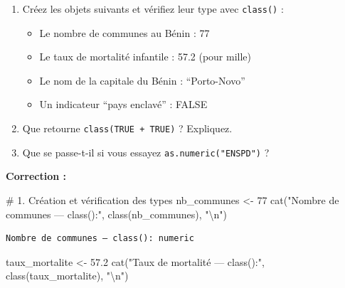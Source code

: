 \documentclass[
  french,
  11pt,
  a4paper,
]{article}
\newenvironment{Shaded}{}{}
\newcommand{\CommentTok}[1]{\textcolor[rgb]{0.42,0.45,0.49}{#1}}
\newcommand{\DecValTok}[1]{\textcolor[rgb]{0.00,0.36,0.77}{#1}}
\newcommand{\FloatTok}[1]{\textcolor[rgb]{0.00,0.36,0.77}{#1}}
\newcommand{\FunctionTok}[1]{\textcolor[rgb]{0.44,0.26,0.76}{#1}}
\newcommand{\NormalTok}[1]{\textcolor[rgb]{0.14,0.16,0.18}{#1}}
\newcommand{\OtherTok}[1]{\textcolor[rgb]{0.44,0.26,0.76}{#1}}
\newcommand{\SpecialCharTok}[1]{\textcolor[rgb]{0.00,0.36,0.77}{#1}}
\newcommand{\StringTok}[1]{\textcolor[rgb]{0.01,0.18,0.38}{#1}}
\providecommand{\tightlist}{%
  \setlength{\itemsep}{0pt}\setlength{\parskip}{0pt}}
\begin{document}
\begin{tcolorbox}[enhanced jigsaw, arc=.35mm, bottomrule=.15mm, bottomtitle=1mm, breakable, colback=white, colbacktitle=quarto-callout-caution-color!10!white, colframe=quarto-callout-caution-color-frame, coltitle=black, left=2mm, leftrule=.75mm, opacityback=0, opacitybacktitle=0.6, rightrule=.15mm, title=\textcolor{quarto-callout-caution-color}{\faFire}\hspace{0.5em}{Exercice 3 --- Types de données}, titlerule=0mm, toprule=.15mm, toptitle=1mm]

\begin{enumerate}
\def\labelenumi{\arabic{enumi}.}
\item
  Créez les objets suivants et vérifiez leur type avec \texttt{class()}
  :

  \begin{itemize}
  \tightlist
  \item
    Le nombre de communes au Bénin : 77
  \item
    Le taux de mortalité infantile : 57.2 (pour mille)
  \item
    Le nom de la capitale du Bénin : ``Porto-Novo''
  \item
    Un indicateur ``pays enclavé'' : FALSE
  \end{itemize}
\item
  Que retourne \texttt{class(TRUE\ +\ TRUE)} ? Expliquez.
\item
  Que se passe-t-il si vous essayez \texttt{as.numeric("ENSPD")} ?
\end{enumerate}

\end{tcolorbox}

\textbf{Correction :}

\begin{Shaded}
\begin{Highlighting}[]
\CommentTok{\# 1. Création et vérification des types}
\NormalTok{nb\_communes }\OtherTok{\textless{}{-}} \DecValTok{77}
\FunctionTok{cat}\NormalTok{(}\StringTok{"Nombre de communes — class():"}\NormalTok{, }\FunctionTok{class}\NormalTok{(nb\_communes), }\StringTok{"}\SpecialCharTok{\textbackslash{}n}\StringTok{"}\NormalTok{)}
\end{Highlighting}
\end{Shaded}

\begin{verbatim}
Nombre de communes — class(): numeric 
\end{verbatim}

\begin{Shaded}
\begin{Highlighting}[]
\NormalTok{taux\_mortalite }\OtherTok{\textless{}{-}} \FloatTok{57.2}
\FunctionTok{cat}\NormalTok{(}\StringTok{"Taux de mortalité — class():"}\NormalTok{, }\FunctionTok{class}\NormalTok{(taux\_mortalite), }\StringTok{"}\SpecialCharTok{\textbackslash{}n}\StringTok{"}\NormalTok{)}
\end{Highlighting}
\end{Shaded}
\end{document}
